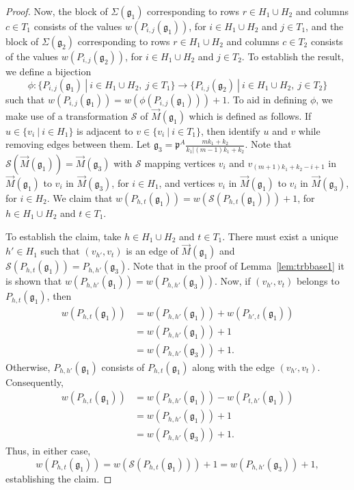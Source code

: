 \documentclass[letterpaper,10pt]{article}
\begin{document}
\begin{proof}
Now, the block of $\Sigma(\mathfrak{g}_1)$ corresponding to rows $r\in H_1\cup H_2$ and columns $c\in T_1$ consists of the values $w(P_{i,j}(\mathfrak{g}_1))$, for $i\in H_1\cup H_2$ and $j\in T_1$, and the block of $\Sigma(\mathfrak{g}_2)$ corresponding to rows $r\in H_1\cup H_2$ and columns $c\in T_2$ consists of the values $w(P_{i,j}(\mathfrak{g}_2))$, for $i\in H_1\cup H_2$ and $j\in T_2$. To establish the result, we define a bijection $$\phi:\{P_{i,j}(\mathfrak{g}_1)~|~i\in H_1\cup H_2,~j\in T_1\}\to\{P_{i,j}(\mathfrak{g}_2)~|~i\in H_1\cup H_2,~j\in T_2\}$$ such that $w(P_{i,j}(\mathfrak{g}_1))=w(\phi(P_{i,j}(\mathfrak{g}_1)))+1$. To aid in defining $\phi$, we make use of a transformation $\mathcal{S}$ of $\overrightarrow{M}(\mathfrak{g}_1)$ which is defined as follows. If $u\in \{v_i~|~i\in H_1\}$ is adjacent to $v\in \{v_i~|~i\in T_1\}$, then identify $u$ and $v$ while removing edges between them. Let $\mathfrak{g}_3=\mathfrak{p}^A\frac{mk_1+k_2}{k_1|(m-1)k_1+k_2}$. Note that $\mathcal{S}(\overrightarrow{M}(\mathfrak{g}_1))=\overrightarrow{M}(\mathfrak{g}_3)$ with $\mathcal{S}$ mapping vertices $v_i$ and $v_{(m+1)k_1+k_2-i+1}$ in $\overrightarrow{M}(\mathfrak{g}_1)$ to $v_i$ in $\overrightarrow{M}(\mathfrak{g}_3)$, for $i\in H_1$, and vertices $v_i$ in $\overrightarrow{M}(\mathfrak{g}_1)$ to $v_i$ in $\overrightarrow{M}(\mathfrak{g}_3)$, for $i\in H_2$. We claim that $w(P_{h,t}(\mathfrak{g}_1))=w(\mathcal{S}(P_{h,t}(\mathfrak{g}_1)))+1$, for $h\in H_1\cup H_2$ and $t\in T_1$. 

To establish the claim, take $h\in H_1\cup H_2$ and $t\in T_1$. There must exist a unique $h'\in H_1$ such that $(v_{h'},v_t)$ is an edge of $\overrightarrow{M}(\mathfrak{g}_1)$ and $\mathcal{S}(P_{h,t}(\mathfrak{g}_1))=P_{h,h'}(\mathfrak{g}_3)$. Note that in the proof of Lemma~\ref{lem:trbbase1} it is shown that $w(P_{h,h'}(\mathfrak{g}_1))=w(P_{h,h'}(\mathfrak{g}_3))$. Now, if $(v_{h'},v_t)$ belongs to $P_{h,t}(\mathfrak{g}_1)$, then 
\begin{align*}
    w(P_{h,t}(\mathfrak{g}_1))&=w(P_{h,h'}(\mathfrak{g}_1))+w(P_{h',t}(\mathfrak{g}_1))\\
    &=w(P_{h,h'}(\mathfrak{g}_1))+1\\
    &=w(P_{h,h'}(\mathfrak{g}_3))+1.
\end{align*}
Otherwise, $P_{h,h'}(\mathfrak{g}_1)$ consists of $P_{h,t}(\mathfrak{g}_1)$ along with the edge $(v_{h'},v_t)$. Consequently,
\begin{align*}
    w(P_{h,t}(\mathfrak{g}_1))&=w(P_{h,h'}(\mathfrak{g}_1))-w(P_{t,h'}(\mathfrak{g}_1))\\
    &=w(P_{h,h'}(\mathfrak{g}_1))+1\\
    &=w(P_{h,h'}(\mathfrak{g}_3))+1.
\end{align*}
Thus, in either case, $$w(P_{h,t}(\mathfrak{g}_1))=w(\mathcal{S}(P_{h,t}(\mathfrak{g}_1)))+1=w(P_{h,h'}(\mathfrak{g}_3))+1,$$ establishing the claim. 


\end{proof}
\end{document}
